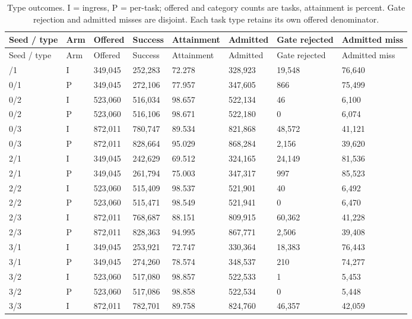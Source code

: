 \documentclass[12pt,a4paper]{article}
\begin{document}
\begingroup
\singlespacing\footnotesize\setlength{\tabcolsep}{3pt}
\renewcommand{\thetable}{D1}
\begin{xltabular}{\textwidth}{@{}YYYYYYYY@{}}
\caption[Type outcomes]{Type outcomes. I = ingress, P = per-task; offered and category counts are tasks, attainment is percent. Gate rejection and admitted misses are disjoint. Each task type retains its own offered denominator.}\label{tab:D1} \\
\toprule
Seed / type & Arm & Offered & Success & Attainment & Admitted & Gate rejected & Admitted miss \\
\midrule\endfirsthead
\toprule
Seed / type & Arm & Offered & Success & Attainment & Admitted & Gate rejected & Admitted miss \\
\midrule\endhead
\bottomrule{}/1 & I & 349,045 & 252,283 & 72.278 & 328,923 & 19,548 & 76,640 \\
0/1 & P & 349,045 & 272,106 & 77.957 & 347,605 & 866 & 75,499 \\
0/2 & I & 523,060 & 516,034 & 98.657 & 522,134 & 46 & 6,100 \\
0/2 & P & 523,060 & 516,106 & 98.671 & 522,180 & 0 & 6,074 \\
0/3 & I & 872,011 & 780,747 & 89.534 & 821,868 & 48,572 & 41,121 \\
0/3 & P & 872,011 & 828,664 & 95.029 & 868,284 & 2,156 & 39,620 \\
2/1 & I & 349,045 & 242,629 & 69.512 & 324,165 & 24,149 & 81,536 \\
2/1 & P & 349,045 & 261,794 & 75.003 & 347,317 & 997 & 85,523 \\
2/2 & I & 523,060 & 515,409 & 98.537 & 521,901 & 40 & 6,492 \\
2/2 & P & 523,060 & 515,471 & 98.549 & 521,941 & 0 & 6,470 \\
2/3 & I & 872,011 & 768,687 & 88.151 & 809,915 & 60,362 & 41,228 \\
2/3 & P & 872,011 & 828,363 & 94.995 & 867,771 & 2,506 & 39,408 \\
3/1 & I & 349,045 & 253,921 & 72.747 & 330,364 & 18,383 & 76,443 \\
3/1 & P & 349,045 & 274,260 & 78.574 & 348,537 & 210 & 74,277 \\
3/2 & I & 523,060 & 517,080 & 98.857 & 522,533 & 1 & 5,453 \\
3/2 & P & 523,060 & 517,086 & 98.858 & 522,534 & 0 & 5,448 \\
3/3 & I & 872,011 & 782,701 & 89.758 & 824,760 & 46,357 & 42,059 \\

\end{xltabular}
\end{document}
